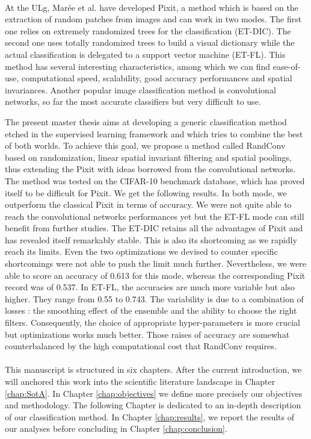 \documentclass[a4paper]{report}
\begin{document}
\paragraph{}
At the ULg, Marée et al. have developed Pixit, a method which is based on the extraction of random patches from images and can work in two modes. The first one relies on extremely randomized trees for the classification (ET-DIC). The second one uses totally randomized trees to build a visual dictionary while the actual classification is delegated to a support vector machine (ET-FL). This method has several interesting characteristics, among which we can find ease-of-use, computational speed, scalability, good accuracy performances and spatial invariances. Another popular image classification method is convolutional networks, so far the most accurate classifiers but very difficult to use. 
\par
The present master thesis aims at developing a generic classification method etched in the supervised learning framework and which tries to combine the best of both worlds. To achieve this goal, we propose a method called RandConv based on randomization, linear spatial invariant filtering and spatial poolings, thus extending the Pixit with ideas borrowed from the convolutional networks. The method was tested on the CIFAR-10 benchmark database, which has proved itself to be difficult for Pixit. We get the following results. In both mode, we outperform the classical Pixit in terms of accuracy. We were not quite able to reach the convolutional networks performances yet but the ET-FL mode can still benefit from further studies. The ET-DIC retains all the advantages of Pixit and has revealed itself remarkably stable. This is also its shortcoming as we rapidly reach its limits. Even the two optimizations we devised to counter specific shortcomings were not able to push the limit much further. Nevertheless, we were able to score an accuracy of 0.613 for this mode, whereas the corresponding Pixit record was of 0.537. In ET-FL, the accuracies are much more variable but also higher. They range from 0.55 to 0.743. The variability is due to a combination of losses : the smoothing effect of the ensemble and the ability to choose the right filters. Consequently, the choice of appropriate hyper-parameters is more crucial but optimizations works much better. Those raises of accuracy are somewhat counterbalanced by the high computational cost that RandConv requires.
\paragraph{}
This manuscript is structured in six chapters. After the current introduction, we will anchored this work into the scientific literature landscape in Chapter \ref{chap:SotA}. In Chapter \ref{chap:objectives} we define more precisely our objectives and methodology. The following Chapter is dedicated to an in-depth description of our classification method. In Chapter \ref{chap:results}, we report the results of our analyses before concluding in Chapter \ref{chap:conclusion}.
\end{document}

